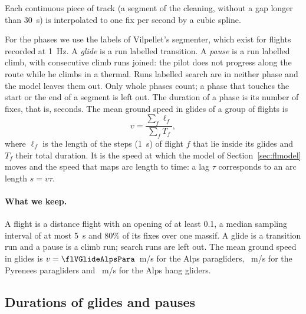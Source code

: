 Each continuous piece of track (a segment of the cleaning, without a gap longer than 30~s) is interpolated to
one fix per second by a cubic spline.

For the phases we use the labels of Vilpellet's segmenter, which exist for flights recorded at 1~Hz. A
\emph{glide} is a run labelled transition. A \emph{pause} is a run labelled climb, with consecutive climb runs joined: the pilot does not progress along the
route while he climbs in a thermal. Runs labelled search are in neither phase and the model leaves them out. Only
whole phases count; a phase that touches the start or the end of a segment is left out. The duration of a phase
is its number of fixes, that is, seconds. The mean ground speed in glides of a group of flights is
\begin{equation}
  v = \frac{\sum_f \ell_f}{\sum_f T_f},
  \label{eq:vglide}
\end{equation}
where $\ell_f$ is the length of the steps (1~s) of flight $f$ that lie inside its glides and $T_f$ their total
duration. It is the speed at which the model of Section~\ref{sec:flmodel} moves and the speed that maps arc
length to time: a lag $\tau$ corresponds to an arc length $s = v\tau$.

\begin{table}[t]
\centering
\caption{The 1~Hz flights of each group with their whole phases. \emph{flights}: those with phases;
\emph{glides} and \emph{pauses}: whole phases; $v$: Eq.~\eqref{eq:vglide} with its 95\% interval from the
bootstrap over flights. A group with fewer than \flMinFlights{} flights, or without phases, is not
interpreted.}
\label{tab:flphases}
\small

\end{table}

\paragraph{What we keep.} A flight is a distance flight with an opening of at least 0.1, a median sampling
interval of at most 5~s and 80\% of its fixes over one massif. A glide is a transition run and a pause is a
climb run; search runs are left out. The mean ground speed in glides is $v = \flVGlideAlpsPara$~m/s for the Alps
paragliders, \flVGlidePyrPara~m/s for the Pyrenees paragliders and \flVGlideAlpsHang~m/s for the Alps hang
gliders.

\subsection{Durations of glides and pauses}\label{sec:flphases}

